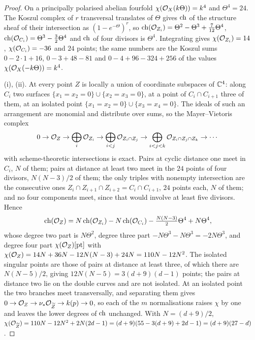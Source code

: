 \begin{proof}
On a principally polarised abelian fourfold $\chi(\mathcal{O}_{X}(k\Theta))=k^{4}$
and $\Theta^{4}=24$. The Koszul complex of $r$ transversal translates of
$\Theta$ gives $\operatorname{ch}$ of the structure sheaf of their intersection as
$(1-e^{-\Theta})^{r}$, so $\operatorname{ch}(\mathcal{O}_{Z_{i}})=\Theta^{2}-\Theta^{3}+\tfrac{7}{12}\Theta^{4}$,
$\operatorname{ch}(\mathcal{O}_{C_{i}})=\Theta^{3}-\tfrac32\Theta^{4}$ and $\operatorname{ch}$ of four divisors
is $\Theta^{4}$. Integrating gives $\chi(\mathcal{O}_{Z_{i}})=14$,
$\chi(\mathcal{O}_{C_{i}})=-36$ and $24$ points; the same numbers are the Koszul sums
$0-2\cdot1+16$, $0-3+48-81$ and $0-4+96-324+256$ of the values
$\chi(\mathcal{O}_{X}(-k\Theta))=k^{4}$.

(i), (ii). At every point $Z$ is locally a union of coordinate subspaces of
$\mathbb{C}^{4}$: along $C_{i}$ two surfaces $\{x_{1}=x_{2}=0\}\cup\{x_{2}=x_{3}=0\}$,
at a point of $C_{i}\cap C_{i+1}$ three of them, at an isolated point
$\{x_{1}=x_{2}=0\}\cup\{x_{3}=x_{4}=0\}$. The ideals of such an arrangement
are monomial and distribute over sums, so the Mayer--Vietoris complex
\[
  0\to\mathcal{O}_{Z}\to\bigoplus_{i}\mathcal{O}_{Z_{i}}\to\bigoplus_{i<j}\mathcal{O}_{Z_{i}\cap Z_{j}}
  \to\bigoplus_{i<j<k}\mathcal{O}_{Z_{i}\cap Z_{j}\cap Z_{k}}\to\cdots
\]
with scheme-theoretic intersections is exact. Pairs at cyclic distance one
meet in $C_{i}$, $N$ of them; pairs at distance at least two meet in the $24$
points of four divisors, $N(N-3)/2$ of them; the only triples with nonempty
intersection are the consecutive ones $Z_{i}\cap Z_{i+1}\cap Z_{i+2}=C_{i}\cap C_{i+1}$,
$24$ points each, $N$ of them; and no four components meet, since that would
involve at least five divisors. Hence
\[
  \operatorname{ch}(\mathcal{O}_{Z})=N\operatorname{ch}(\mathcal{O}_{Z_{i}})-N\operatorname{ch}(\mathcal{O}_{C_{i}})-\tfrac{N(N-3)}{2}\Theta^{4}+N\Theta^{4},
\]
whose degree two part is $N\Theta^{2}$, degree three part
$-N\Theta^{3}-N\Theta^{3}=-2N\Theta^{3}$, and degree four part
$\chi(\mathcal{O}_{Z})[\mathrm{pt}]$ with $\chi(\mathcal{O}_{Z})=14N+36N-12N(N-3)+24N=110N-12N^{2}$.
The isolated singular points are those of pairs at distance at least three,
of which there are $N(N-5)/2$, giving $12N(N-5)=3(d+9)(d-1)$ points; the
pairs at distance two lie on the double curves and are not isolated. At an
isolated point the two branches meet transversally, and separating them
gives $0\to\mathcal{O}_{Z}\to\nu_{*}\mathcal{O}_{\widetilde Z}\to k(p)\to0$, so each of the
$m$ normalisations raises $\chi$ by one and leaves the lower degrees of
$\operatorname{ch}$ unchanged. With $N=(d+9)/2$,
$\chi(\mathcal{O}_{\widetilde Z})=110N-12N^{2}+2N(2d-1)=(d+9)(55-3(d+9)+2d-1)=(d+9)(27-d)$.


\end{proof}
